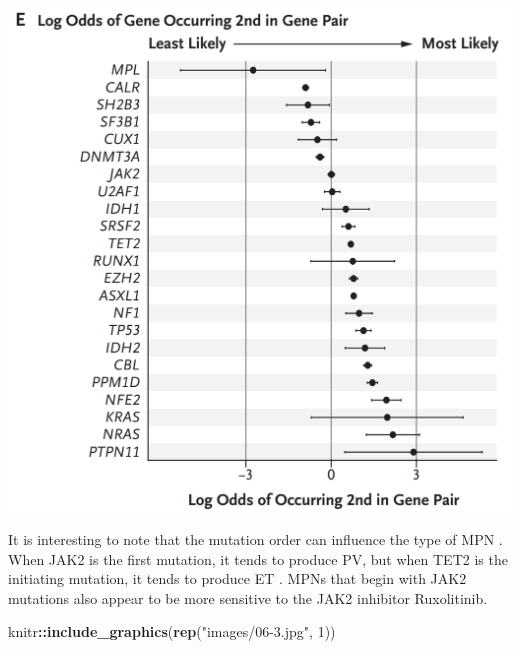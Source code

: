 \documentclass[]{book}
\newenvironment{Shaded}{\begin{snugshade}}{\end{snugshade}}
\newcommand{\KeywordTok}[1]{\textcolor[rgb]{0.13,0.29,0.53}{\textbf{#1}}}
\newcommand{\DataTypeTok}[1]{\textcolor[rgb]{0.13,0.29,0.53}{#1}}
\newcommand{\DecValTok}[1]{\textcolor[rgb]{0.00,0.00,0.81}{#1}}
\newcommand{\StringTok}[1]{\textcolor[rgb]{0.31,0.60,0.02}{#1}}
\newcommand{\OtherTok}[1]{\textcolor[rgb]{0.56,0.35,0.01}{#1}}
\newcommand{\OperatorTok}[1]{\textcolor[rgb]{0.81,0.36,0.00}{\textbf{#1}}}
\newcommand{\NormalTok}[1]{#1}
\begin{document}
\includegraphics{images/06-2.jpg}

\begin{Shaded}
\end{Shaded}

\citep{grinfeld2018classification}

It is interesting to note that the mutation order can influence the type
of MPN \citep{ortmann2015effect, nangalia2015dnmt3a}. When JAK2 is the
first mutation, it tends to produce PV, but when TET2 is the initiating
mutation, it tends to produce ET \citep{ortmann2015effect}. MPNs that
begin with JAK2 mutations also appear to be more sensitive to the JAK2
inhibitor Ruxolitinib.

\begin{Shaded}
\begin{Highlighting}[]
\NormalTok{knitr}\OperatorTok{::}\KeywordTok{include_graphics}\NormalTok{(}\KeywordTok{rep}\NormalTok{(}\StringTok{"images/06-3.jpg"}\NormalTok{, }\DecValTok{1}\NormalTok{))          }
\end{Highlighting}
\end{Shaded}
\end{document}
